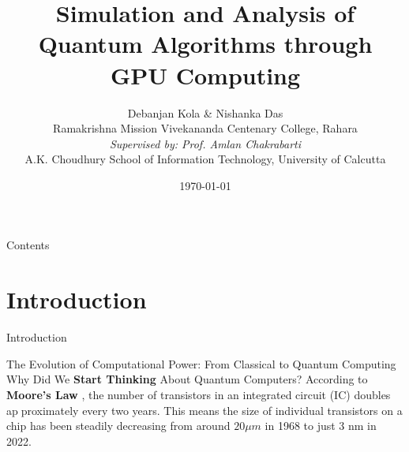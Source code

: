 \documentclass[12pt, aspectratio=169]{beamer}
\author[Debanjan Kola \& Nishanka Das]{%
Debanjan Kola \& Nishanka Das\\
\small Ramakrishna Mission Vivekananda Centenary College, Rahara\\[1ex]
\small \textit{Supervised by: Prof.  Amlan Chakrabarti}\\
A.K. Choudhury School of Information Technology, University of Calcutta
}
\date{\today}
\title{Simulation and Analysis of Quantum Algorithms through GPU Computing}
\begin{document}
\begin{frame}
\titlepage{}
\end{frame}
\begin{frame}[allowframebreaks]{Contents}
    \tableofcontents
\end{frame}

\section{Introduction}
\begin{frame}{Introduction}
 \begin{block}{The Evolution of Computational Power: From Classical to Quantum Computing}
 Why Did We \textbf{Start Thinking} About Quantum Computers?  According to \textbf{Moore’s Law} , the number of transistors in an integrated circuit (IC) doubles approximately every two years. This means the size of individual transistors on a
chip has been steadily decreasing from around $20 \mu m$  in 1968 to just 3 nm 
 in 2022.     
 \end{block}

\end{frame}
\end{document}

